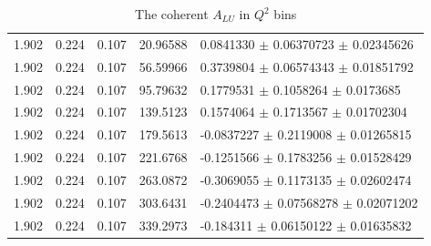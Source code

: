\begin{table}[!h]
\begin{center}
\begin{tabular}{||l|l|l|l|l||}
         1.902 & 0.224 & 0.107 &  20.96588   &    0.0841330  $\pm$   0.06370723  $\pm$   0.02345626 \\
         1.902 & 0.224 & 0.107 &  56.59966   &    0.3739804  $\pm$   0.06574343  $\pm$   0.01851792 \\
         1.902 & 0.224 & 0.107 &  95.79632   &    0.1779531  $\pm$   0.1058264   $\pm$   0.0173685  \\
         1.902 & 0.224 & 0.107 &  139.5123   &    0.1574064  $\pm$   0.1713567   $\pm$   0.01702304 \\
         1.902 & 0.224 & 0.107 &  179.5613   &   -0.0837227  $\pm$   0.2119008   $\pm$   0.01265815 \\
         1.902 & 0.224 & 0.107 &  221.6768   &   -0.1251566  $\pm$   0.1783256   $\pm$   0.01528429 \\
         1.902 & 0.224 & 0.107 &  263.0872   &   -0.3069055  $\pm$   0.1173135   $\pm$   0.02602474 \\
         1.902 & 0.224 & 0.107 &  303.6431   &   -0.2404473  $\pm$   0.07568278  $\pm$   0.02071202 \\
         1.902 & 0.224 & 0.107 &  339.2973   &   -0.184311   $\pm$   0.06150122  $\pm$   0.01635832 \\
      \hline \hline
      \end{tabular}
      \caption{ The coherent $A_{LU}$ in $Q^2$ bins}
      \label{table:Coh_Q2_BSA}
   \end{center}
\end{table}                    

